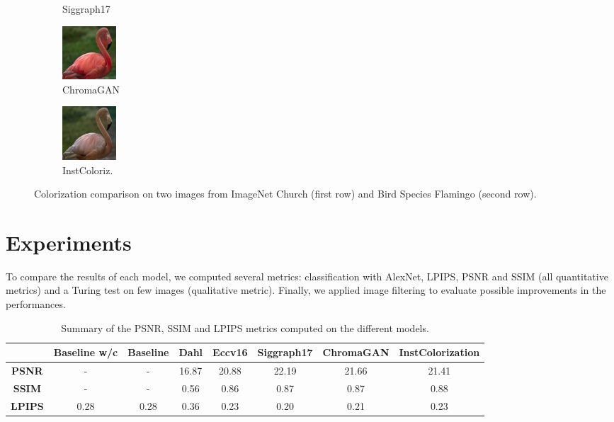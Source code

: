 \documentclass[10pt,twocolumn,letterpaper]{article}
\begin{document}
\begin{figure}[ht]
\begin{subfigure}[b]{0.1\textwidth}
		\caption{Siggraph17}
	\end{subfigure}
	\hfill
	\begin{subfigure}[b]{0.1\textwidth}
		\includegraphics[width=2cm]{chr - flamingo.jpg}
		\caption{ChromaGAN}
	\end{subfigure}
	\hfill
	\begin{subfigure}[b]{0.1\textwidth}
		\includegraphics[width=2cm]{su - flamingo.png}
		\caption{InstColoriz.}
	\end{subfigure}
	\caption{{\small Colorization comparison on two images from ImageNet Church (first row) and Bird Species Flamingo (second row).}}
	\label{fig:imagenet}
\end{figure}



\section{Experiments}
To compare the results of each model, we computed several metrics: classification with AlexNet, LPIPS, PSNR and SSIM (all quantitative metrics) and a Turing test on few images (qualitative metric). Finally, we applied image filtering to evaluate possible improvements in the performances.

\begin{table}[ht]
	\begin{center}
		\begin{tabular}{c|ccccccc}
			& \textbf{Baseline w/c}&\textbf{Baseline} & \textbf{Dahl} & \textbf{Eccv16} & \textbf{Siggraph17} & \textbf{ChromaGAN} & \textbf{InstColorization}  \\
			\midrule
			\textbf{PSNR} & - & - & 16.87 & 20.88 & 22.19 & 21.66 & 21.41 \\
			\midrule
			\textbf{SSIM} & - & - & 0.56 & 0.86 & 0.87 & 0.87 & 0.88 \\
			\midrule
			\textbf{LPIPS} & 0.28 & 0.28 & 0.36 & 0.23 & 0.20 & 0.21 & 0.23 \\
		\end{tabular}
	\end{center}
	\caption{{\small  Summary of the PSNR, SSIM and LPIPS metrics computed on the different models.}}
	\label{tab:metrics}
\end{table}
\end{document}
